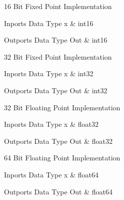 \nopagebreak[0]

16 Bit Fixed Point Implementation

\begin{XtoCtabular}{Inports Data Type}
x & int16\tabularnewline
\hline
\end{XtoCtabular}

\begin{XtoCtabular}{Outports Data Type}
Out & int16\tabularnewline
\hline
\end{XtoCtabular}

\ifdefined \AddTestReports
{}
\fi
{}
\nopagebreak[0]

32 Bit Fixed Point Implementation

\begin{XtoCtabular}{Inports Data Type}
x & int32\tabularnewline
\hline
\end{XtoCtabular}

\begin{XtoCtabular}{Outports Data Type}
Out & int32\tabularnewline
\hline
\end{XtoCtabular}

\ifdefined \AddTestReports
{}
\fi
{}
\nopagebreak[0]

32 Bit Floating Point Implementation

\begin{XtoCtabular}{Inports Data Type}
x & float32\tabularnewline
\hline
\end{XtoCtabular}

\begin{XtoCtabular}{Outports Data Type}
Out & float32\tabularnewline
\hline
\end{XtoCtabular}

\ifdefined \AddTestReports
{}
\fi
{}
\nopagebreak[0]

64 Bit Floating Point Implementation

\begin{XtoCtabular}{Inports Data Type}
x & float64\tabularnewline
\hline
\end{XtoCtabular}

\begin{XtoCtabular}{Outports Data Type}
Out & float64\tabularnewline
\hline
\end{XtoCtabular}

\ifdefined \AddTestReports
{}
\fi

